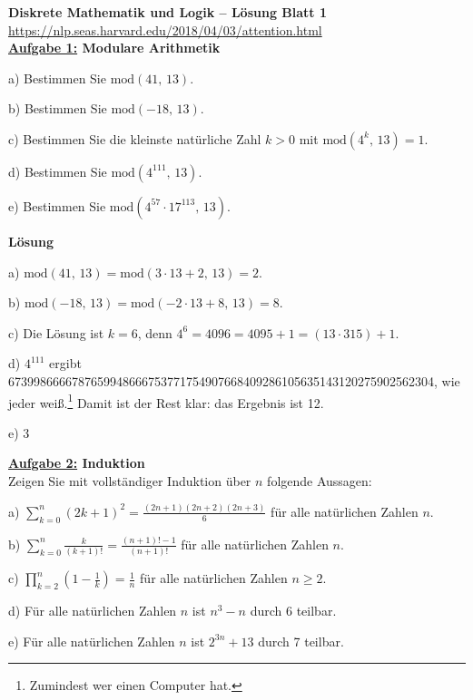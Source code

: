 \documentclass[]{article}
\begin{document}
{\Large\bf Diskrete Mathematik und Logik -- Lösung Blatt 1}\\%
\url{https://nlp.seas.harvard.edu/2018/04/03/attention.html}\\[+0.5cm]
{\bf\underline{Aufgabe 1:} Modulare Arithmetik}\\[-0.8cm]
\begin{list}{}{}
\item[a)]
Bestimmen Sie $\text{mod}(41,\,13)$.
\item[b)]
Bestimmen Sie $\text{mod}(-18,\,13)$.
\item[c)]
Bestimmen Sie die kleinste natürliche Zahl $k>0$ mit $\text{mod}(4^k,\,13)=1$.
\item[d)]
Bestimmen Sie $\text{mod}(4^{111},\,13)$.
\item[e)]
Bestimmen Sie $\text{mod}(4^{57}\cdot17^{113},\,13)$.
\end{list}
{\bf Lösung}\\[-0.8cm]
\begin{list}{}{}
\item[a)]
$\text{mod}(41,\,13)=\text{mod}(3\cdot13+2,\,13)=2$.
\item[b)]
$\text{mod}(-18,\,13)=\text{mod}(-2\cdot13+8,\,13)=8$.
\item[c)]
Die Lösung ist $k=6$, denn $4^6=4096=4095+1=(13\cdot315)+1$.
\item[d)]
$4^{111}$ ergibt 6739986666787659948666753771754907668409286105635143120275902562304, wie jeder weiß.\footnote{Zumindest wer einen Computer hat.} Damit ist der Rest klar: das Ergebnis ist 12.
\item[e)]
3
\end{list}
{\bf\underline{Aufgabe 2:} Induktion}\\[+0.3cm]
Zeigen Sie mit vollständiger Induktion über $n$ folgende Aussagen:\\[-0.8cm]
\begin{list}{}{}
\item[a)]
$\sum_{k=0}^n(2k{+}1)^2=\frac{(2n+1)(2n+2)(2n+3)}{6}$ für alle natürlichen Zahlen $n$.
\item[b)]
$\sum_{k=0}^n\frac{k}{(k+1)!}=\frac{(n+1)!-1}{(n+1)!}$ für alle natürlichen Zahlen $n$.
\item[c)]
$\prod_{k=2}^n\left(1-\frac{1}{k}\right)=\frac{1}{n}$ für alle natürlichen Zahlen $n\geq2$.
\item[d)]
Für alle natürlichen Zahlen $n$ ist $n^3-n$ durch 6 teilbar.
\item[e)]
Für alle natürlichen Zahlen $n$ ist $2^{3n}+13$ durch 7 teilbar.
\end{list}
\end{document}
